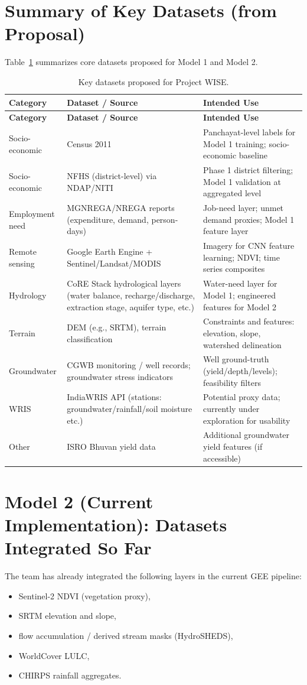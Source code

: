 \documentclass[12pt,a4paper]{report}
\begin{document}
\section{Summary of Key Datasets (from Proposal)}
Table~\ref{tab:datasets} summarizes core datasets proposed for Model 1 and Model 2.

\begin{longtable}{p{} p{} p{}}
\caption{Key datasets proposed for Project WISE.}\label{tab:datasets}\\
\toprule
\textbf{Category} & \textbf{Dataset / Source} & \textbf{Intended Use} \\
\midrule
\endfirsthead
\toprule
\textbf{Category} & \textbf{Dataset / Source} & \textbf{Intended Use} \\
\midrule
\endhead
Socio-economic & Census 2011 & Panchayat-level labels for Model 1 training; socio-economic baseline \\
Socio-economic & NFHS (district-level) via NDAP/NITI & Phase 1 district filtering; Model 1 validation at aggregated level \\
Employment need & MGNREGA/NREGA reports (expenditure, demand, person-days) & Job-need layer; unmet demand proxies; Model 1 feature layer \\
Remote sensing & Google Earth Engine + Sentinel/Landsat/MODIS & Imagery for CNN feature learning; NDVI; time series composites \\
Hydrology & CoRE Stack hydrological layers (water balance, recharge/discharge, extraction stage, aquifer type, etc.) & Water-need layer for Model 1; engineered features for Model 2 \\
Terrain & DEM (e.g., SRTM), terrain classification & Constraints and features: elevation, slope, watershed delineation \\
Groundwater & CGWB monitoring / well records; groundwater stress indicators & Well ground-truth (yield/depth/levels); feasibility filters \\
WRIS & IndiaWRIS API (stations: groundwater/rainfall/soil moisture etc.) & Potential proxy data; currently under exploration for usability \\
Other & ISRO Bhuvan yield data & Additional groundwater yield features (if accessible) \\
\bottomrule
\end{longtable}

\section{Model 2 (Current Implementation): Datasets Integrated So Far}
The team has already integrated the following layers in the current GEE pipeline:
\begin{itemize}
  \item Sentinel-2 NDVI (vegetation proxy),
  \item SRTM elevation and slope,
  \item flow accumulation / derived stream masks (HydroSHEDS),
  \item WorldCover LULC,
  \item CHIRPS rainfall aggregates.
\end{itemize}
\end{document}
